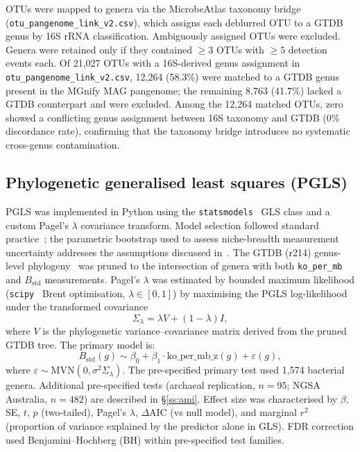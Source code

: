 \documentclass[times]{zHenriquesLab-StyleBioRxiv}
\begin{document}
OTUs were mapped to genera via the MicrobeAtlas taxonomy bridge
(\texttt{otu\_pangenome\_link\_v2.csv}), which assigns each deblurred OTU to a
GTDB genus by 16S rRNA classification. Ambiguously assigned OTUs were excluded.
Genera were retained only if they contained $\geq 3$ OTUs with $\geq 5$
detection events each. Of 21,027 OTUs with a 16S-derived genus assignment in
\texttt{otu\_pangenome\_link\_v2.csv}, 12,264 (58.3\%) were matched to a GTDB
genus present in the MGnify MAG pangenome; the remaining 8,763 (41.7\%) lacked
a GTDB counterpart and were excluded. Among the 12,264 matched OTUs, zero showed
a conflicting genus assignment between 16S taxonomy and GTDB (0\% discordance
rate), confirming that the taxonomy bridge introduces no systematic cross-genus
contamination.

\subsection{Phylogenetic generalised least squares (PGLS)}

PGLS \cite{freckleton2002,garland2005,symonds2014} was implemented in Python using the \texttt{statsmodels}~\cite{seabold2010} GLS class and a
custom Pagel's $\lambda$ covariance transform. Model selection followed standard
practice~\cite{symonds2014}; the parametric bootstrap used to assess niche-breadth
measurement uncertainty addresses the assumptions discussed in~\cite{mundry2014}. The GTDB (r214) genus-level
phylogeny~\cite{parks2022} was pruned to the intersection of genera with both
\texttt{ko\_per\_mb} and $B_\mathrm{std}$ measurements. Pagel's $\lambda$ was
estimated by bounded maximum likelihood (\texttt{scipy}~\cite{virtanen2020} Brent optimisation,
$\lambda \in [0, 1]$) by maximising the PGLS log-likelihood under the
transformed covariance
\[
\Sigma_\lambda = \lambda V + (1-\lambda)I,
\]
where $V$ is the phylogenetic variance--covariance matrix derived from the
pruned GTDB tree. The primary model is:
\[
B_\mathrm{std}(g) \sim \beta_0 + \beta_1 \cdot \mathrm{ko\_per\_mb\_z}(g)
  + \varepsilon(g),
\]
where $\varepsilon \sim \mathrm{MVN}(0, \sigma^2 \Sigma_\lambda)$. The
pre-specified primary test used 1,574 bacterial genera. Additional
pre-specified tests (archaeal replication, $n = 95$; NGSA Australia, $n = 482$) are
described in \S\ref{ss:ami}. Effect size was characterised by $\beta$, SE, $t$,
$p$ (two-tailed), Pagel's $\lambda$, $\Delta$AIC (vs null model), and marginal
$r^2$ (proportion of variance explained by the predictor alone in GLS).
FDR correction used Benjamini--Hochberg (BH) within pre-specified test families.
\end{document}
